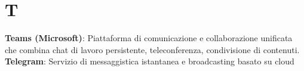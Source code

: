 \section{T}
\textbf{Teams (Microsoft)}: Piattaforma di comunicazione e collaborazione unificata che combina chat di lavoro persistente, teleconferenza, condivisione di contenuti.\\
\textbf{Telegram}: Servizio di messaggistica istantanea e broadcasting basato su cloud\\
